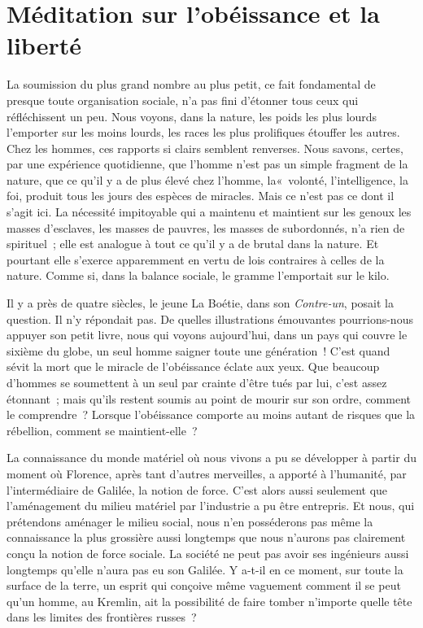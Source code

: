 \documentclass[french,twoside]{book} %
\begin{document}
\begin{center}
\end{center}
\section[Méditation sur l’obéissance et la liberté]{Méditation sur l’obéissance et la liberté}\renewcommand{\leftmark}{Méditation sur l’obéissance et la liberté}

\noindent \par
La soumission du plus grand nombre au plus petit, ce fait fondamental de presque toute organisation sociale, n'a pas fini d'étonner tous ceux qui réfléchissent un peu. Nous voyons, dans la nature, les poids les plus lourds l'emporter sur les moins lourds, les races les plus prolifiques étouffer les autres. Chez les hommes, ces rapports si clairs semblent renverses. Nous savons, certes, par une expérience quotidienne, que l'homme n'est pas un simple fragment de la nature, que ce qu'il y a de plus élevé chez l'homme, la« volonté, l'intelligence, la foi, produit tous les jours des espèces de miracles. Mais ce n'est pas ce dont il s'agit ici. La nécessité impitoyable qui a maintenu et maintient sur les genoux les masses d'esclaves, les masses de pauvres, les masses de subordonnés, n'a rien de spirituel ; elle est analogue à tout ce qu'il y a de brutal dans la nature. Et pourtant elle s'exerce apparemment en vertu de lois contraires à celles de la nature. Comme si, dans la balance sociale, le gramme l'emportait sur le kilo.\par
Il y a près de quatre siècles, le jeune La Boétie, dans son {\itshape Contre-un}, posait la question. Il n'y répondait pas. De quelles illustrations émouvantes pourrions-nous appuyer son petit livre, nous qui voyons aujourd'hui, dans un pays qui couvre le sixième du globe, un seul homme saigner toute une génération ! C'est quand sévit la mort que le miracle de l'obéissance éclate aux yeux. Que beaucoup d'hommes se soumettent à un seul par crainte d'être tués par lui, c'est assez étonnant ; mais qu'ils restent soumis au point de mourir sur son ordre, comment le comprendre ? Lorsque l'obéissance comporte au moins autant de risques que la rébellion, comment se maintient-elle ?\par
La connaissance du monde matériel où nous vivons a pu se développer à partir du moment où Florence, après tant d'autres merveilles, a apporté à l'humanité, par l'intermédiaire de Galilée, la notion de force. C'est alors aussi seulement que l'aménagement du milieu matériel par l'industrie a pu être entrepris. Et nous, qui prétendons aménager le milieu social, nous n'en posséderons pas même la connaissance la plus grossière aussi longtemps que nous n'aurons pas clairement conçu la notion de force sociale. La société ne peut pas avoir ses ingénieurs aussi longtemps qu'elle n'aura pas eu son Galilée. Y a-t-il en ce moment, sur toute la surface de la terre, un esprit qui conçoive même vaguement comment il se peut qu'un homme, au Kremlin, ait la possibilité de faire tomber n'importe quelle tête dans les limites des frontières russes ?\par
\end{document}
